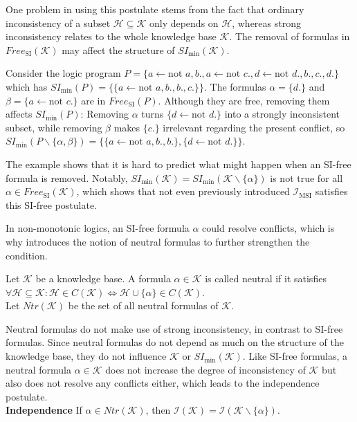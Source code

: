 One problem in using this postulate stems from the fact that ordinary inconsistency of a subset \(\mathcal{H} \subseteq \mathcal{K}\) only depends on \(\mathcal{H}\), whereas strong inconsistency relates to the whole knowledge base \(\mathcal{K}\). The removal of formulas in \(Free_{\text{SI}}(\mathcal{K})\) may affect the structure of \(SI_{\min}(\mathcal{K})\).

\begin{example}
    Consider the logic program \(P = \{a \leftarrow \text{not } a, b., a \leftarrow \text{not }c., d \leftarrow \text{not }d., b., c., d.\}\) which has \(SI_{\min}(P) = \{\{a \leftarrow \text{not }a,b., b., c.\}\}\). The formulas \(\alpha = \{d.\}\) and \(\beta = \{a \leftarrow \text{not }c.\}\) are in \(Free_{\text{SI}}(P)\). Although they are free, removing them affects \(SI_{\min}(P)\): Removing \(\alpha\) turns \(\{d \leftarrow \text{not }d.\}\) into a strongly inconsistent subset, while removing \(\beta\) makes \(\{c.\}\) irrelevant regarding the present conflict, so \(SI_{\min}(P \backslash \{\alpha, \beta\}) = \{\{a \leftarrow \text{not }a,b., b.\}, \{d \leftarrow \text{not }d.\}\}\).
\end{example}

The example shows that it is hard to predict what might happen when an SI-free formula is removed. Notably, \(SI_{\min}(\mathcal{K}) = SI_{\min}(\mathcal{K} \backslash \{\alpha\})\) is not true for all \(\alpha \in Free_{\text{SI}}(\mathcal{K})\), which shows that not even previously introduced \(\mathcal{I}_{\text{MSI}}\) satisfies this SI-free postulate.

In non-monotonic logics, an SI-free formula \(\alpha\) could resolve conflicts, which is why \cite{brewka_strong_2017} introduces the notion of neutral formulas to further strengthen the condition.

\begin{definition}\label{def:independence}
    Let \(\mathcal{K}\) be a knowledge base. A formula \(\alpha \in \mathcal{K}\) is called neutral if it satisfies\\
    \(\forall \mathcal{H} \subseteq \mathcal{K}: \mathcal{H} \in C(\mathcal{K}) \Leftrightarrow \mathcal{H} \cup \{\alpha\} \in C(\mathcal{K})\).\\
    Let \(Ntr(\mathcal{K})\) be the set of all neutral formulas of \(\mathcal{K}\).
\end{definition}

Neutral formulas do not make use of strong inconsistency, in contrast to SI-free formulas. Since neutral formulas do not depend as much on the structure of the knowledge base, they do not influence \(\mathcal{K}\) or \(SI_{\min}(\mathcal{K})\). Like SI-free formulas, a neutral formula \(\alpha \in \mathcal{K}\) does not increase the degree of inconsistency of \(\mathcal{K}\) but also does not resolve any conflicts either, which leads to the independence postulate.
\\
\textbf{Independence}
If \(\alpha \in Ntr(\mathcal{K})\), then \(\mathcal{I}(\mathcal{K}) = \mathcal{I}(\mathcal{K} \backslash \{\alpha\})\).

